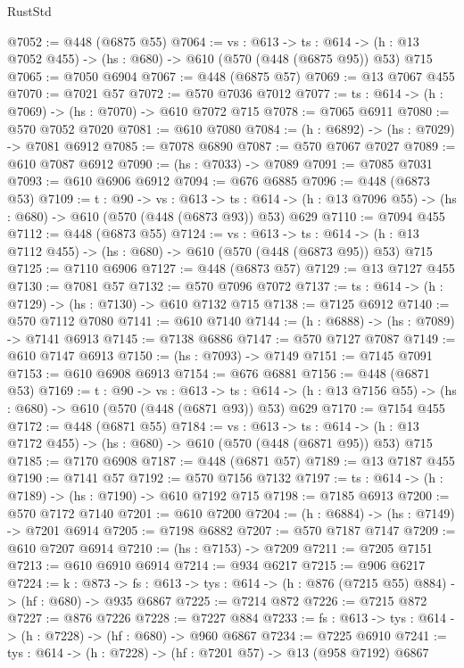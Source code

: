 \begin{lexlean}{RustStd}
\begin{coremodule}
@7052 := @448 (@6875 @55)
@7064 := {vs : @613} ->
  {ts : @614} -> (h : @13 @7052 @455) -> (hs : @680) -> @610 (@570 (@448 (@6875 @95)) @53) @715
@7065 := @7050 @6904
@7067 := @448 (@6875 @57)
@7069 := @13 @7067 @455
@7070 := @7021 @57
@7072 := @570 @7036 @7012
@7077 := {ts : @614} -> (h : @7069) -> (hs : @7070) -> @610 @7072 @715
@7078 := @7065 @6911
@7080 := @570 @7052 @7020
@7081 := @610 @7080
@7084 := (h : @6892) -> (hs : @7029) -> @7081 @6912
@7085 := @7078 @6890
@7087 := @570 @7067 @7027
@7089 := @610 @7087 @6912
@7090 := (hs : @7033) -> @7089
@7091 := @7085 @7031
@7093 := @610 @6906 @6912
@7094 := @676 @6885
@7096 := @448 (@6873 @53)
@7109 := {t : @90} ->
  {vs : @613} ->
  {ts : @614} -> (h : @13 @7096 @55) -> (hs : @680) -> @610 (@570 (@448 (@6873 @93)) @53) @629
@7110 := @7094 @455
@7112 := @448 (@6873 @55)
@7124 := {vs : @613} ->
  {ts : @614} -> (h : @13 @7112 @455) -> (hs : @680) -> @610 (@570 (@448 (@6873 @95)) @53) @715
@7125 := @7110 @6906
@7127 := @448 (@6873 @57)
@7129 := @13 @7127 @455
@7130 := @7081 @57
@7132 := @570 @7096 @7072
@7137 := {ts : @614} -> (h : @7129) -> (hs : @7130) -> @610 @7132 @715
@7138 := @7125 @6912
@7140 := @570 @7112 @7080
@7141 := @610 @7140
@7144 := (h : @6888) -> (hs : @7089) -> @7141 @6913
@7145 := @7138 @6886
@7147 := @570 @7127 @7087
@7149 := @610 @7147 @6913
@7150 := (hs : @7093) -> @7149
@7151 := @7145 @7091
@7153 := @610 @6908 @6913
@7154 := @676 @6881
@7156 := @448 (@6871 @53)
@7169 := {t : @90} ->
  {vs : @613} ->
  {ts : @614} -> (h : @13 @7156 @55) -> (hs : @680) -> @610 (@570 (@448 (@6871 @93)) @53) @629
@7170 := @7154 @455
@7172 := @448 (@6871 @55)
@7184 := {vs : @613} ->
  {ts : @614} -> (h : @13 @7172 @455) -> (hs : @680) -> @610 (@570 (@448 (@6871 @95)) @53) @715
@7185 := @7170 @6908
@7187 := @448 (@6871 @57)
@7189 := @13 @7187 @455
@7190 := @7141 @57
@7192 := @570 @7156 @7132
@7197 := {ts : @614} -> (h : @7189) -> (hs : @7190) -> @610 @7192 @715
@7198 := @7185 @6913
@7200 := @570 @7172 @7140
@7201 := @610 @7200
@7204 := (h : @6884) -> (hs : @7149) -> @7201 @6914
@7205 := @7198 @6882
@7207 := @570 @7187 @7147
@7209 := @610 @7207 @6914
@7210 := (hs : @7153) -> @7209
@7211 := @7205 @7151
@7213 := @610 @6910 @6914
@7214 := @934 @6217
@7215 := @906 @6217
@7224 := {k : @873} ->
  {fs : @613} -> {tys : @614} -> (h : @876 (@7215 @55) @884) -> (hf : @680) -> @935 @6867
@7225 := @7214 @872
@7226 := @7215 @872
@7227 := @876 @7226
@7228 := @7227 @884
@7233 := {fs : @613} -> {tys : @614} -> (h : @7228) -> (hf : @680) -> @960 @6867
@7234 := @7225 @6910
@7241 := {tys : @614} -> (h : @7228) -> (hf : @7201 @57) -> @13 (@958 @7192) @6867

\end{coremodule}
\end{lexlean}
